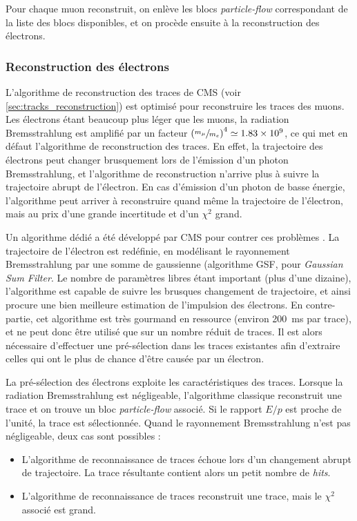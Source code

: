 Pour chaque muon reconstruit, on enlève les blocs \emph{particle-flow} correspondant de la liste des blocs disponibles, et on procède ensuite à la reconstruction des électrons.

\subsubsection{Reconstruction des électrons}

L'algorithme de reconstruction des traces de CMS (voir \cref{sec:tracks_reconstruction}) est optimisé pour reconstruire les traces des muons. Les électrons étant beaucoup plus léger que les muons, la radiation Bremsstrahlung est amplifié par un facteur $\left( \sfrac{m_\mu}{m_e} \right)^4 \simeq \num{1.83e9}$, ce qui met en défaut l'algorithme de reconstruction des traces. En effet, la trajectoire des électrons peut changer brusquement lors de l'émission d'un photon Bremsstrahlung, et l'algorithme de reconstruction n'arrive plus à suivre la trajectoire abrupt de l'électron. En cas d'émission d'un photon de basse énergie, l'algorithme peut arriver à reconstruire quand même la trajectoire de l'électron, mais au prix d'une grande incertitude et d'un $\chi^2$ grand.

Un algorithme dédié a été développé par CMS pour contrer ces problèmes \citep{pf,cms_pf_leptons,cms_pf_electrons}. La trajectoire de l'électron est redéfinie, en modélisant le rayonnement Bremsstrahlung par une somme de gaussienne (algorithme GSF, pour \emph{Gaussian Sum Filter}. Le nombre de paramètres libres étant important (plus d'une dizaine), l'algorithme est capable de suivre les brusques changement de trajectoire, et ainsi procure une bien meilleure estimation de l'impulsion des électrons. En contre-partie, cet algorithme est très gourmand en ressource (environ \SI{200}{\ms} par trace), et ne peut donc être utilisé que sur un nombre réduit de traces. Il est alors nécessaire d'effectuer une pré-sélection dans les traces existantes afin d'extraire celles qui ont le plus de chance d'être causée par un électron.

La pré-sélection des électrons exploite les caractéristiques des traces. Lorsque la radiation Bremsstrahlung est négligeable, l'algorithme classique reconstruit une trace et on trouve un bloc \emph{particle-flow} associé. Si le rapport $E/p$ est proche de l'unité, la trace est sélectionnée. Quand le rayonnement Bremsstrahlung n'est pas négligeable, deux cas sont possibles :
\begin{itemize}
    \item L'algorithme de reconnaissance de traces échoue lors d'un changement abrupt de trajectoire. La trace résultante contient alors un petit nombre de \emph{hits}.
    \item L'algorithme de reconnaissance de traces reconstruit une trace, mais le $\chi^2$ associé est grand.
\end{itemize}


